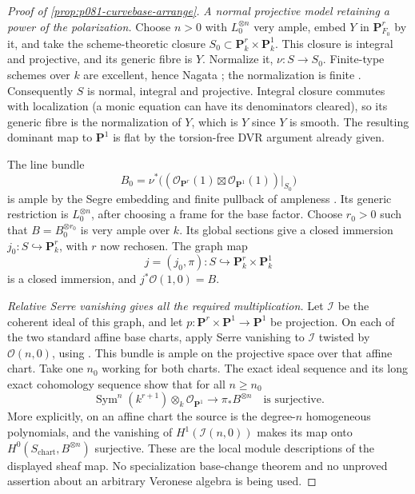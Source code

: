 \begin{proof}[Proof of \cref{prop:p081-curvebase-arrange}]
\emph{A normal projective model retaining a power of the polarization.}
Choose \(n>0\) with \(L_0^{\otimes n}\) very ample, embed
\(Y\) in \(\mathbf P^r_{F_0}\) by it, and take the scheme-theoretic
closure \(S_0\subset\mathbf P^r_k\times\mathbf P^1_k\).
This closure is integral and projective, and its generic fibre is \(Y\).
Normalize it, \(\nu:S\to S_0\).
Finite-type schemes over \(k\) are excellent, hence Nagata
\cite[Tag 07QS]{Stacks}; the normalization is finite
\cite[Tag 035S]{Stacks}. Consequently \(S\) is normal, integral and
projective. Integral closure commutes with localization (a monic
equation can have its denominators cleared), so its generic fibre is
the normalization of \(Y\), which is \(Y\) since \(Y\) is smooth.
The resulting dominant map to \(\mathbf P^1\) is flat by the
torsion-free DVR argument already given.

The line bundle
\[
          B_0=\nu^*\bigl((\mathcal O_{\mathbf P^r}(1)
                     \boxtimes\mathcal O_{\mathbf P^1}(1))|_{S_0}\bigr)
\]
is ample by the Segre embedding and finite pullback of ampleness
\cite[Tag 0B5V]{Stacks}. Its generic restriction is
\(L_0^{\otimes n}\), after choosing a frame for the base factor.
Choose \(r_0>0\) such that \(B=B_0^{\otimes r_0}\) is very ample
over \(k\). Its global sections give a closed immersion
\(j_0:S\hookrightarrow\mathbf P^r_k\), with \(r\) now rechosen.
The graph map
\[
        j=(j_0,\pi):S\hookrightarrow
                          \mathbf P^r_k\times\mathbf P^1_k
\]
is a closed immersion, and \(j^*\mathcal O(1,0)=B\).

\emph{Relative Serre vanishing gives all the required multiplication.}
Let \(\mathcal I\) be the coherent ideal of this graph, and let
\(p:\mathbf P^r\times\mathbf P^1\to\mathbf P^1\) be projection.
On each of the two standard affine base charts, apply Serre vanishing
to \(\mathcal I\) twisted by \(\mathcal O(n,0)\), using
\cite[Tag 0B5T(4)]{Stacks}. This bundle is ample on the projective
space over that affine chart. Take one \(n_0\) working for both charts.
The exact ideal sequence and its long exact cohomology sequence show
that for all \(n\geq n_0\)
\begin{equation}\label{eq:p081-curvebase-poly-surjection}
 \operatorname{Sym}^n(k^{r+1})\otimes_k\mathcal O_{\mathbf P^1}
                     \longrightarrow\pi_*B^{\otimes n}
                 \quad\text{is surjective}.
\end{equation}
More explicitly, on an affine chart the source is the degree-\(n\)
homogeneous polynomials, and the vanishing of
\(H^1(\mathcal I(n,0))\) makes its map onto
\(H^0(S_{\mathrm{chart}},B^{\otimes n})\) surjective.
These are the local module descriptions of the displayed sheaf map.
No specialization base-change theorem and no unproved assertion about
an arbitrary Veronese algebra is being used.


\end{proof}
